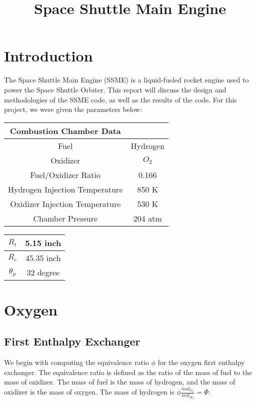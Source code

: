 \documentclass[12pt, Times New Roman]{article}
\title{Space Shuttle Main Engine}
\begin{document}
    \maketitle
    
    \tableofcontents

    \section{Introduction}
    The Space Shuttle Main Engine (SSME) is a liquid-fueled rocket engine used to power the Space Shuttle Orbiter. 
    This report will discuss the design and methodologies of the SSME code, as well as the results of the code.
    For this project, we were given the parameters below:
    \begin{center}
        \begin{tabular}{|c|c|}
            \hline
            Combustion Chamber Data & \\
            \hline
            Fuel & Hydrogen \\
            \hline
            Oxidizer & $O_{2}$ \\
            \hline
            Fuel/Oxidizer Ratio & 0.166 \\
            \hline
            Hydrogen Injection Temperature & 850 K \\
            \hline
            Oxidizer Injection Temperature & 530 K \\
            \hline
            Chamber Pressure & 204 atm \\
            \hline
        \end{tabular}

        \vspace*{6pt}

        \begin{tabular}{|c|c|}
            \hline
            $R_{t}$ & 5.15 inch \\
            \hline
            $R_{e}$ & 45.35 inch \\
            \hline
            $\theta_{p}$ & 32 degree \\
            \hline
        \end{tabular}
    \end{center}

    \section{Oxygen}

    \subsection{First Enthalpy Exchanger}
    We begin with computing the equivalence ratio $\phi$  for the oxygen first enthalpy exchanger. 
    The equivalence ratio is defined as the ratio of the mass of fuel to the mass of oxidizer. 
    The mass of fuel is the mass of hydrogen, and the mass of oxidizer is the mass of oxygen. 
    The mass of hydrogen is $\phi \frac{mol_{O_{2}}}{mol_{H_{2}}} = \Phi$.
\end{document}
